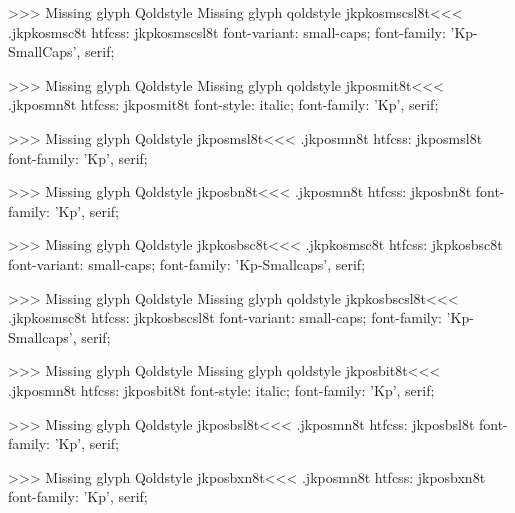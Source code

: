 >>>
Missing glyph	Qoldstyle
Missing glyph	qoldstyle
\<jkpkosmscsl8t\><<<
.jkpkosmsc8t
htfcss:  jkpkosmscsl8t  font-variant: small-caps; font-family: 'Kp-SmallCaps', serif;

>>>
Missing glyph	Qoldstyle
Missing glyph	qoldstyle
\<jkposmit8t\><<<
.jkposmn8t
htfcss:  jkposmit8t  font-style: italic; font-family: 'Kp', serif;

>>>
Missing glyph	Qoldstyle
\<jkposmsl8t\><<<
.jkposmn8t
htfcss:  jkposmsl8t  font-family: 'Kp', serif;

>>>
Missing glyph	Qoldstyle
\<jkposbn8t\><<<
.jkposmn8t
htfcss:  jkposbn8t  font-family: 'Kp', serif;

>>>
Missing glyph	Qoldstyle
\<jkpkosbsc8t\><<<
.jkpkosmsc8t
htfcss:  jkpkosbsc8t  font-variant: small-caps; font-family: 'Kp-Smallcaps', serif;

>>>
Missing glyph	Qoldstyle
Missing glyph	qoldstyle
\<jkpkosbscsl8t\><<<
.jkpkosmsc8t
htfcss:  jkpkosbscsl8t  font-variant: small-caps; font-family: 'Kp-Smallcaps', serif;

>>>
Missing glyph	Qoldstyle
Missing glyph	qoldstyle
\<jkposbit8t\><<<
.jkposmn8t
htfcss:  jkposbit8t  font-style: italic; font-family: 'Kp', serif;

>>>
Missing glyph	Qoldstyle
\<jkposbsl8t\><<<
.jkposmn8t
htfcss:  jkposbsl8t  font-family: 'Kp', serif;

>>>
Missing glyph	Qoldstyle
\<jkposbxn8t\><<<
.jkposmn8t
htfcss:  jkposbxn8t  font-family: 'Kp', serif;

